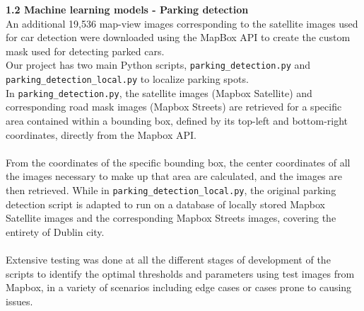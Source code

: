 \textbf{1.2 Machine learning models - Parking detection}\\
An additional 19,536 map-view images corresponding to the satellite images used for car detection were downloaded using the MapBox API to create the custom mask used for detecting parked cars.\\
Our project has two main Python scripts, \texttt{parking\_detection.py} and\\ \texttt{parking\_detection\_local.py} to localize parking spots.\\
In \texttt{parking\_detection.py}, the satellite images (Mapbox Satellite) and corresponding road mask images (Mapbox Streets) are retrieved for a specific area contained within a bounding box, defined by its top-left and bottom-right coordinates, directly from the Mapbox API.\\ \\
From the coordinates of the specific bounding box, the center coordinates of all the images necessary to make up that area are calculated, and the images are then retrieved.
While in \texttt{parking\_detection\_local.py}, the original parking detection script is adapted to run on a database of locally stored Mapbox Satellite images and the corresponding Mapbox Streets images, covering the entirety of Dublin city.\\ \\

Extensive testing was done at all the different stages of development of the scripts to identify the optimal thresholds and parameters using test images from Mapbox, in a variety of scenarios including edge cases or cases prone to causing issues.\\


